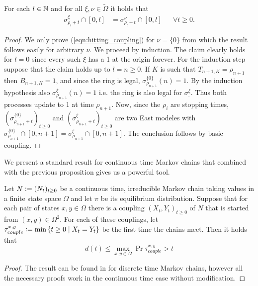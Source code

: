 \begin{proposition}\label{prop:East_linear_coupling}
For each $l \in \mathbb{N}$ and for all $\xi, \nu \in \widetilde{\Omega}$ it holds that 
\begin{align*}
\sigma^\xi_{\rho_l + t} \cap [0, l] &= \sigma^\nu_{\rho_l + t} \cap [0, l] &&\forall t \geq 0. \label{eqn:hitting_coupling}
\end{align*}
\end{proposition}

\begin{proof}
We only prove (\ref{eqn:hitting_coupling}) for $\nu = \{0\}$ from which the result follows easily for arbitrary $\nu$. We proceed by induction. The claim clearly holds for $l=0$ since every such $\xi$ has a 1 at the origin forever. For the induction step suppose that the claim holds up to $l=n \geq 0$. If $K$ is such that $T_{n+1, K} = \rho_{n+1}$ then $B_{n+1, K}=1$, and since the ring is legal, $\sigma^{\{0\}}_{\rho_{n+1}}(n) = 1$. By the induction hypothesis also $\sigma^\xi_{\rho_{n+1}}(n) = 1$ i.e. the ring is also legal for $\sigma^\xi_.$. Thus both processes update to 1 at time $\rho_{n+1}$. Now, since the $\rho_i$ are stopping times, $(\sigma^{\{0\}}_{\rho_{n+1}+t})_{t \geq 0}$ and $(\sigma^\xi_{\rho_{n+1} + t})_{t \geq 0}$ are two East modeles with $\sigma^{\{0\}}_{\rho_{n+1}} \cap [0, n+1] = \sigma^\xi_{\rho_{n+1}} \cap [0, n+1] $. The conclusion follows by basic coupling. 
\end{proof}

We present a standard result for continuous time Markov chains that combined with the previous proposition gives us a powerful tool. 

\begin{theorem}\label{thm:equilibrium_distance}
Let $N \vcentcolon= (N_t)_{t \geq 0}$ be a continuous time, irreducible Markov chain taking values in a finite state space $\Omega$ and let $\pi$ be its equilibrium distribution. Suppose that for each pair of states $x,y \in \Omega$ there is a coupling $(X_t, Y_t)_{t \geq 0}$ of $N$ that is started from $(x,y) \in \Omega^2$. For each of these couplings, let $\tau^{x, y}_{couple} \vcentcolon= \min\left\{t \geq 0 \mid X_t = Y_t \right\}$ be the first time the chains meet. Then it holds that 
\begin{equation}\nonumber
d(t) \leq \max\limits_{x,y \in \Omega} \Pr{\tau^{x, y}_{couple} > t}
\end{equation}
\end{theorem}

\begin{proof}
The result can be found in \cite[Corollary 5.3]{levin2017markov} for discrete time Markov chains, however all the necessary proofs work in the continuous time case without modification. 
\end{proof}

